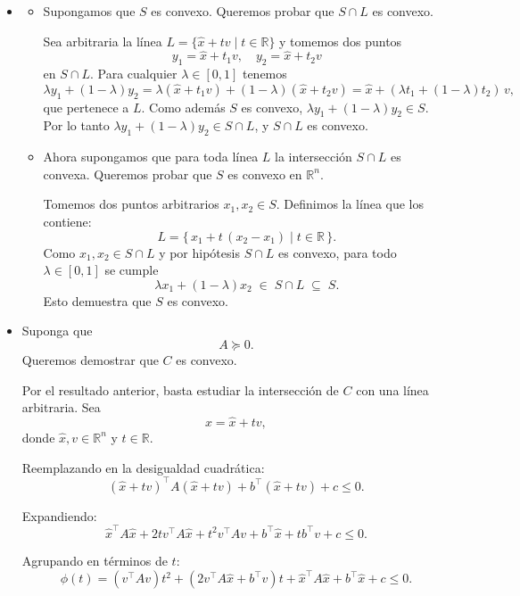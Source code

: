 \begin{itemize}
  \item[(a)]
  \begin{itemize}
  \item[$\Rightarrow$:] Supongamos que $S$ es convexo. Queremos probar que $S\cap L$ es convexo.

  Sea arbitraria la línea 
  $L=\{\hat x+t v\mid t\in\mathbb{R}\}$ y tomemos dos puntos 
  \[
    y_1 = \hat x + t_1 v,\quad 
    y_2 = \hat x + t_2 v
  \]
  en $S\cap L$. Para cualquier $\lambda\in[0,1]$ tenemos
  \[
    \lambda y_1 + (1-\lambda)y_2 
    = \lambda(\hat x + t_1 v) + (1-\lambda)(\hat x + t_2 v)
    = \hat x + (\lambda t_1 + (1-\lambda)t_2)\,v,
  \]
  que pertenece a $L$. Como además $S$ es convexo, $\lambda y_1+(1-\lambda)y_2\in S$.  
  Por lo tanto $\lambda y_1 + (1-\lambda)y_2 \in S\cap L$, y $S\cap L$ es convexo.
  \item[$\Leftarrow$:] Ahora supongamos que para toda línea $L$ la intersección $S\cap L$ es convexa. 
  Queremos probar que $S$ es convexo en $\mathbb{R}^n$. 

  Tomemos dos puntos arbitrarios $x_1,x_2\in S$. Definimos la línea que los contiene:
  \[
    L = \{\,x_1 + t\,(x_2 - x_1)\mid t\in\mathbb{R}\,\}.
  \]
  Como $x_1,x_2\in S\cap L$ y por hipótesis $S\cap L$ es convexo, para todo $\lambda\in[0,1]$ se cumple
  \[
    \lambda x_1 + (1-\lambda)x_2 
    \;\in\; S\cap L
    \;\subseteq\; S.
  \]
  Esto demuestra que $S$ es convexo.
  \end{itemize}
  \item[(b)] Suponga que
    \[
    A\succeq 0.
    \]
    Queremos demostrar que \(C\) es convexo.

    Por el resultado anterior, basta estudiar la intersección de \(C\) con una línea arbitraria. Sea
    \[
    x=\hat{x}+tv,
    \]
    donde \(\hat{x},v\in\mathbb{R}^n\) y \(t\in\mathbb{R}\).

    Reemplazando en la desigualdad cuadrática:
    \[
    (\hat{x}+tv)^\top A(\hat{x}+tv)
    +
    b^\top(\hat{x}+tv)
    +
    c
    \leq 0.
    \]

    Expandiendo:
    \[
    \hat{x}^\top A\hat{x}
    +
    2t v^\top A\hat{x}
    +
    t^2 v^\top A v
    +
    b^\top \hat{x}
    +
    t b^\top v
    +
    c
    \leq 0.
    \]

    Agrupando en términos de \(t\):
    \[
    \phi(t)
    =
    (v^\top A v)t^2
    +
    \left(2v^\top A\hat{x}+b^\top v\right)t
    +
    \hat{x}^\top A\hat{x}
    +
    b^\top \hat{x}
    +
    c
    \leq 0.
    \]


\end{itemize}
